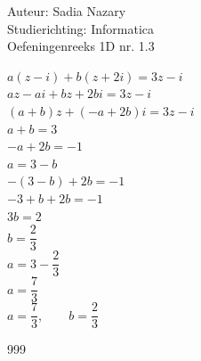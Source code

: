 \documentclass[a4paper]{article}
\begin{document}
  
\noindent \large Auteur: Sadia Nazary  \\
\noindent \large Studierichting: Informatica\\
\noindent \large Oefeningenreeks 1D nr. 1.3\\

\medskip

\normalsize


$a(z-i)+b(z+2i)=3z-i$\\

$az-ai+bz+2bi=3z-i$\\

$(a+b)z+(-a+2b)i=3z-i$\\

$a+b=3$\\

$-a+2b=-1$\\

$a=3-b$\\

$-(3-b)+2b=-1$\\

$-3+b+2b=-1$\\

$3b=2$\\

$b=\dfrac{2}{3}$\\

$a=3-\dfrac{2}{3}$\\

$a=\dfrac{7}{3}$\\

$a=\dfrac{7}{3}, \qquad b=\dfrac{2}{3}$

\begin{thebibliography}{999}
\end{thebibliography}
\end{document}
